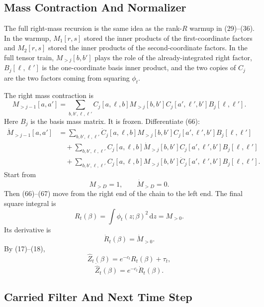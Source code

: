 \documentclass[11pt]{article}
\newcommand{\dd}{\,\mathrm d}
\begin{document}
\subsection{Mass Contraction And Normalizer}

The full right-mass recursion is the same idea as the rank-\(R\) warmup in
(29)--(36).  In the warmup, \(M_1[r,s]\) stored the inner products of the
first-coordinate factors and \(M_2[r,s]\) stored the inner products of the
second-coordinate factors.  In the full tensor train, \(M_{>j}[b,b']\) plays
the role of the already-integrated right factor, \(B_j[\ell,\ell']\) is the
one-coordinate basis inner product, and the two copies of \(C_j\) are the two
factors coming from squaring \(\phi_t\).

The right mass contraction is
\[
    M_{>j-1}[a,a']
    =
    \sum_{b,b',\ell,\ell'}
    C_j[a,\ell,b]
    M_{>j}[b,b']
    C_j[a',\ell',b']
    B_j[\ell,\ell'].
    \tag{P19-66}
\]
Here \(B_j\) is the basis mass matrix.  It is frozen.  Differentiate (66):
\[
\begin{aligned}
    \dot M_{>j-1}[a,a']
    &=
    \sum_{b,b',\ell,\ell'}
    \dot C_j[a,\ell,b]
    M_{>j}[b,b']
    C_j[a',\ell',b']
    B_j[\ell,\ell']\\
    &\quad+
    \sum_{b,b',\ell,\ell'}
    C_j[a,\ell,b]
    \dot M_{>j}[b,b']
    C_j[a',\ell',b']
    B_j[\ell,\ell']\\
    &\quad+
    \sum_{b,b',\ell,\ell'}
    C_j[a,\ell,b]
    M_{>j}[b,b']
    \dot C_j[a',\ell',b']
    B_j[\ell,\ell'].
\end{aligned}
\tag{P19-67}
\]
Start from
\[
    M_{>D}=1,
    \qquad
    \dot M_{>D}=0.
    \tag{P19-68}
\]
Then (66)--(67) move from the right end of the chain to the left end.  The
final square integral is
\[
    R_t(\beta)=\int\phi_t(z;\beta)^2\dd z=M_{>0}.
    \tag{P19-69}
\]
Its derivative is
\[
    \dot R_t(\beta)=\dot M_{>0}.
    \tag{P19-70}
\]
By (17)--(18),
\[
    \widehat Z_t(\beta)=e^{-c_t}R_t(\beta)+\tau_t,
    \tag{P19-71}
\]
\[
    \dot{\widehat Z}_t(\beta)=e^{-c_t}\dot R_t(\beta).
    \tag{P19-72}
\]

\subsection{Carried Filter And Next Time Step}
\end{document}

